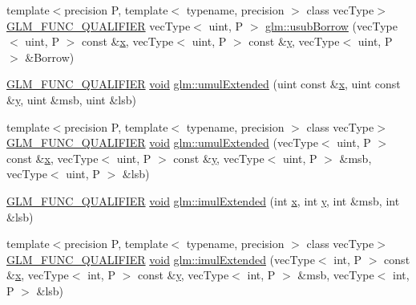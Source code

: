 \begin{DoxyCompactItemize}
\item 
{\footnotesize template$<$precision P, template$<$ typename, precision $>$ class vec\+Type$>$ }\\\mbox{\hyperlink{setup_8hpp_a33fdea6f91c5f834105f7415e2a64407}{G\+L\+M\+\_\+\+F\+U\+N\+C\+\_\+\+Q\+U\+A\+L\+I\+F\+I\+ER}} vec\+Type$<$ uint, P $>$ \mbox{\hyperlink{group__core__func__integer_ga22a889bf08313b7e547e2cdb8bb15ee4}{glm\+::usub\+Borrow}} (vec\+Type$<$ uint, P $>$ const \&\mbox{\hyperlink{glad_8h_a92d0386e5c19fb81ea88c9f99644ab1d}{x}}, vec\+Type$<$ uint, P $>$ const \&\mbox{\hyperlink{glad_8h_a66ddd433d2cacfe27f5906b7e86faeed}{y}}, vec\+Type$<$ uint, P $>$ \&Borrow)
\item 
\mbox{\hyperlink{setup_8hpp_a33fdea6f91c5f834105f7415e2a64407}{G\+L\+M\+\_\+\+F\+U\+N\+C\+\_\+\+Q\+U\+A\+L\+I\+F\+I\+ER}} \mbox{\hyperlink{glad_8h_a950fc91edb4504f62f1c577bf4727c29}{void}} \mbox{\hyperlink{namespaceglm_a8d2521311c96c4b426be9857010b6b76}{glm\+::umul\+Extended}} (uint const \&\mbox{\hyperlink{glad_8h_a92d0386e5c19fb81ea88c9f99644ab1d}{x}}, uint const \&\mbox{\hyperlink{glad_8h_a66ddd433d2cacfe27f5906b7e86faeed}{y}}, uint \&msb, uint \&lsb)
\item 
{\footnotesize template$<$precision P, template$<$ typename, precision $>$ class vec\+Type$>$ }\\\mbox{\hyperlink{setup_8hpp_a33fdea6f91c5f834105f7415e2a64407}{G\+L\+M\+\_\+\+F\+U\+N\+C\+\_\+\+Q\+U\+A\+L\+I\+F\+I\+ER}} \mbox{\hyperlink{glad_8h_a950fc91edb4504f62f1c577bf4727c29}{void}} \mbox{\hyperlink{group__core__func__integer_ga456ff9dcec42f6769a9ae2a2af7f1ce1}{glm\+::umul\+Extended}} (vec\+Type$<$ uint, P $>$ const \&\mbox{\hyperlink{glad_8h_a92d0386e5c19fb81ea88c9f99644ab1d}{x}}, vec\+Type$<$ uint, P $>$ const \&\mbox{\hyperlink{glad_8h_a66ddd433d2cacfe27f5906b7e86faeed}{y}}, vec\+Type$<$ uint, P $>$ \&msb, vec\+Type$<$ uint, P $>$ \&lsb)
\item 
\mbox{\hyperlink{setup_8hpp_a33fdea6f91c5f834105f7415e2a64407}{G\+L\+M\+\_\+\+F\+U\+N\+C\+\_\+\+Q\+U\+A\+L\+I\+F\+I\+ER}} \mbox{\hyperlink{glad_8h_a950fc91edb4504f62f1c577bf4727c29}{void}} \mbox{\hyperlink{namespaceglm_a940501aa5c66bc19f9ba6ddfe0110097}{glm\+::imul\+Extended}} (int \mbox{\hyperlink{glad_8h_a92d0386e5c19fb81ea88c9f99644ab1d}{x}}, int \mbox{\hyperlink{glad_8h_a66ddd433d2cacfe27f5906b7e86faeed}{y}}, int \&msb, int \&lsb)
\item 
{\footnotesize template$<$precision P, template$<$ typename, precision $>$ class vec\+Type$>$ }\\\mbox{\hyperlink{setup_8hpp_a33fdea6f91c5f834105f7415e2a64407}{G\+L\+M\+\_\+\+F\+U\+N\+C\+\_\+\+Q\+U\+A\+L\+I\+F\+I\+ER}} \mbox{\hyperlink{glad_8h_a950fc91edb4504f62f1c577bf4727c29}{void}} \mbox{\hyperlink{group__core__func__integer_ga6e6e8b29ca40d8ca2df10b58ed17d426}{glm\+::imul\+Extended}} (vec\+Type$<$ int, P $>$ const \&\mbox{\hyperlink{glad_8h_a92d0386e5c19fb81ea88c9f99644ab1d}{x}}, vec\+Type$<$ int, P $>$ const \&\mbox{\hyperlink{glad_8h_a66ddd433d2cacfe27f5906b7e86faeed}{y}}, vec\+Type$<$ int, P $>$ \&msb, vec\+Type$<$ int, P $>$ \&lsb)

\end{DoxyCompactItemize}
